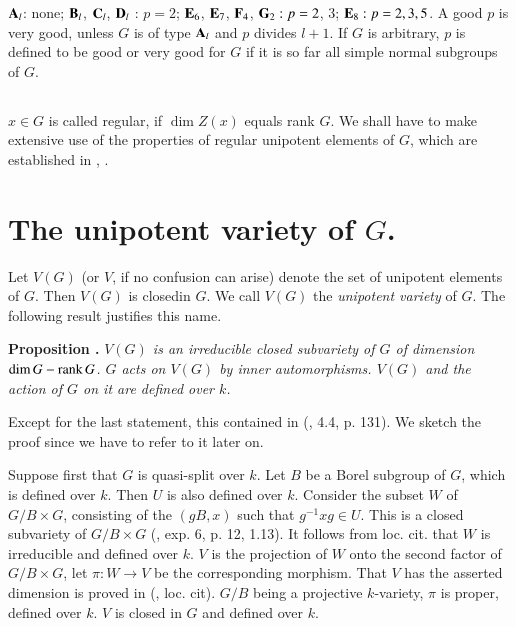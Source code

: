 $\mathbf{A}_{l}$: none; $\mathbf{B}_{l}$, $\mathbf{C}_{l}$, $\mathbf{D}_{l}$ : $p=2$; $\mathbf{E}_{6}$, $\mathbf{E}_{7}$, $\mathbf{F}_{4}$, $\mathbf{G}_{2} : p = 2$, $3$; $\mathbf{E}_{8} : p=2,3,5$. A good $p$ is very good, unless $G$ is of type $\mathbf{A}_{l}$ and $p$ divides $l+1$. If $G$ is arbitrary, $p$ is defined to be good or very good for $G$ if it is so far all simple normal subgroups of $G$.

\subsection{}\label{art19-sec0.4}
$x\in G$ is called regular, if $\dim Z(x)$ equals rank $G$. We shall have to make extensive use of the properties of regular unipotent elements of $G$, which are established in \cite{art19-key14}, \cite{art19-key15}.

\section{The unipotent variety of \texorpdfstring{$G$}{G}.}\label{art19-sec1}

Let $V(G)$ (or $V$, if no confusion can arise) denote the set of unipotent elements of $G$. Then $V(G)$ is closed\pageoriginale in $G$. We call $V(G)$ the {\em unipotent variety} of $G$. The following result justifies this name.

\medskip
\noindent
{\bf Proposition .\label{art19-prop1.1}}
{\em $V(G)$ is an irreducible closed subvariety of $G$ of dimension $\dim G - \operatorname{\mathrm{rank}} G$. $G$ acts on $V(G)$ by inner automorphisms. $V(G)$ and the action of $G$ on it are defined over $k$.}
\smallskip

Except for the last statement, this contained in (\cite{art19-key14}, 4.4, p. 131). We sketch the proof since we have to refer to it later on.

Suppose first that $G$ is quasi-split over $k$. Let $B$ be a Borel subgroup of $G$, which is defined over $k$. Then $U$ is also defined over $k$. Consider the subset $W$ of $G/B\times G$, consisting of the $(gB,x)$ such that $g^{-1}xg\in U$. This is a closed subvariety of $G/B\times G$ (\cite{art19-key5}, exp. 6, p. 12, 1.13). It follows from loc. cit. that $W$ is irreducible and defined over $k$. $V$ is the projection of $W$ onto the second factor of $G/B\times G$, let $\pi :W\to V$ be the corresponding morphism. That $V$ has the asserted dimension is proved in (\cite{art19-key14}, loc. cit). $G/B$ being a projective $k$-variety, $\pi$ is proper, defined over $k$. $V$ is closed in $G$ and defined over $k$.

